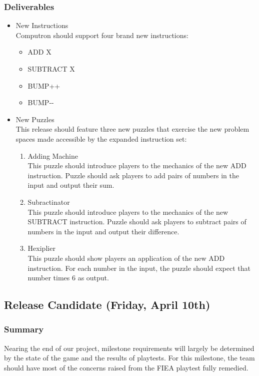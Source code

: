 \subsubsection*{Deliverables}
\begin{itemize}
	\item New Instructions\\
	Computron should support four brand new instructions:
	\begin{itemize}
		\item ADD X
		\item SUBTRACT X
		\item BUMP++
		\item BUMP-\--
	\end{itemize}
	\item New Puzzles\\
	This release should feature three new puzzles that exercise the new problem spaces 
	made accessible by the expanded instruction set:
	\begin{enumerate}
	\item Adding Machine\\
	This puzzle should introduce players to the mechanics of the new ADD instruction. 
	Puzzle should ask players to add pairs of numbers in the input and output their sum.
	\item Subractinator\\
	This puzzle should introduce players to the mechanics of the new SUBTRACT instruction. 
	Puzzle should ask players to subtract pairs of numbers in the input and output their difference.
	\item Hexiplier\\
	This puzzle should show players an application of the new ADD instruction. For each number 
	in the input, the puzzle should expect that number times 6 as output.
	\end{enumerate}
\end{itemize}

\subsection{Release Candidate (Friday, April 10th)}

\subsubsection*{Summary}
Nearing the end of our project, milestone requirements will largely be determined by 
the state of the game and the results of playtests. For this milestone, the team should 
have most of the concerns raised from the FIEA playtest fully remedied.

